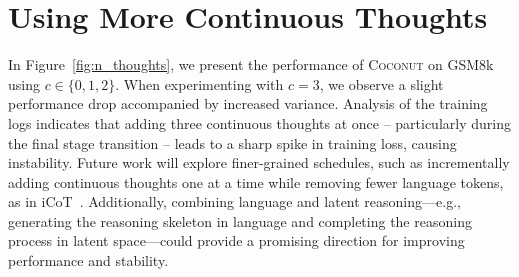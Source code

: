 \documentclass[]{fairmeta}
\newcommand{\ours}{\textsc{Coconut}\xspace}
\begin{document}
\section{Using More Continuous Thoughts}
\label{sec:larger_c}
In Figure~\ref{fig:n_thoughts}, we present the performance of \ours on GSM8k using $c \in \{0, 1, 2\}$. When experimenting with $c=3$, we observe a slight performance drop accompanied by increased variance. Analysis of the training logs indicates that adding three continuous thoughts at once -- particularly during the final stage transition -- leads to a sharp spike in training loss, causing instability. Future work will explore finer-grained schedules, such as incrementally adding continuous thoughts one at a time while removing fewer language tokens, as in iCoT~\citep{deng2024explicit}. Additionally, combining language and latent reasoning—e.g., generating the reasoning skeleton in language and completing the reasoning process in latent space—could provide a promising direction for improving performance and stability.
\end{document}
